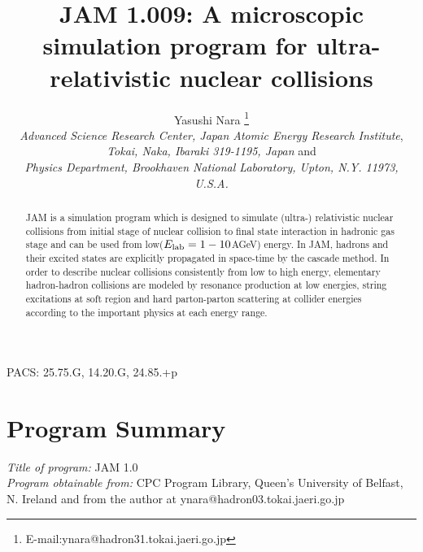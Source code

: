 \documentclass[]{article}
\def\VERSION{1.009}
\newcommand{\Elab}{\mbox{$E_{\rm lab}$}}
\begin{document}
\sloppy


\title{\bf JAM \VERSION:
A microscopic simulation program
 for ultra-relativistic nuclear collisions
}
\author{Yasushi Nara \thanks{E-mail:ynara@hadron31.tokai.jaeri.go.jp}\\
  {\it Advanced Science Research Center, 
        Japan Atomic Energy Research Institute}, \\
 {\it Tokai, Naka, Ibaraki 319-1195, Japan}
     and\\
 {\it Physics Department,
  Brookhaven National Laboratory, Upton, N.Y. 11973, U.S.A.}}

\date{}
\maketitle

\begin{abstract}
\noindent
JAM is a simulation program which
 is designed to simulate (ultra-) relativistic nuclear collisions
 from initial stage of nuclear collision to final state interaction
 in hadronic gas stage
 and
 can be used from low($\Elab=1-10$AGeV) energy.
In JAM, hadrons and their excited states
 are explicitly propagated in space-time by the cascade method.
In order to describe nuclear collisions consistently from low to high energy,
  elementary hadron-hadron collisions are modeled by resonance production
  at low energies, string excitations at soft region and
  hard parton-parton scattering at collider energies according to
  the important physics at each energy range.
\end{abstract}

PACS: 25.75.G, 14.20.G, 24.85.+p


\section{Program Summary}

{\noindent\em Title of program:} JAM 1.0\\

{\noindent\em Program obtainable from:}
 CPC Program Library, Queen's University of Belfast, N. Ireland
 and from the author at ynara@hadron03.tokai.jaeri.go.jp\\
\end{document}
